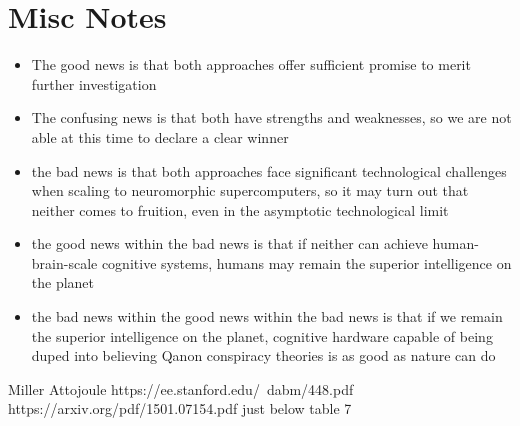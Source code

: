\documentclass[twocolumn]{article}
\begin{document}
\section{Misc Notes}
\begin{itemize}
    \item The good news is that both approaches offer sufficient promise to merit further investigation
    \item The confusing news is that both have strengths and weaknesses, so we are not able at this time to declare a clear winner
    \item the bad news is that both approaches face significant technological challenges when scaling to neuromorphic supercomputers, so it may turn out that neither comes to fruition, even in the asymptotic technological limit
    \item the good news within the bad news is that if neither can achieve human-brain-scale cognitive systems, humans may remain the superior intelligence on the planet
    \item the bad news within the good news within the bad news is that if we remain the superior intelligence on the planet, cognitive hardware capable of being duped into believing Qanon conspiracy theories is as good as nature can do
\end{itemize}




\begin{thebibliography}{}
 Miller Attojoule https://ee.stanford.edu/~dabm/448.pdf
https://arxiv.org/pdf/1501.07154.pdf just below table 7

\end{thebibliography}
\end{document}
